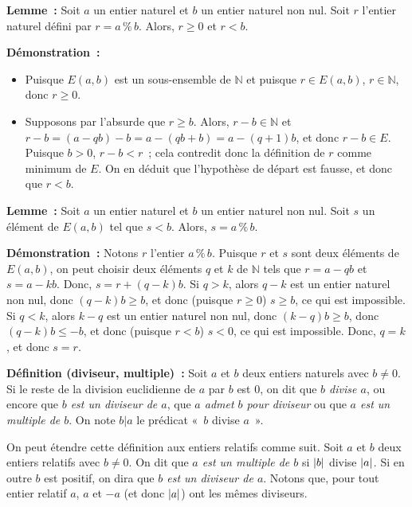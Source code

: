 \noindent\textbf{Lemme :} Soit $a$ un entier naturel et $b$ un entier naturel non nul.
    Soit $r$ l'entier naturel défini par $r = a \mathrel{\%} b$.
    Alors, $r \geq 0$ et $r < b$.

\medskip

\noindent\textbf{Démonstration :} 
\begin{itemize}[nosep]
    \item Puisque $E(a,b)$ est un sous-ensemble de $\mathbb{N}$ et puisque $r \in E(a,b)$, $r \in \mathbb{N}$, donc $r \geq 0$.
    \item Supposons par l'absurde que $r \geq b$. 
        Alors, $r - b \in \mathbb{N}$ et $r - b = (a - q b) - b = a - (q b + b) = a - (q+1) b$, et donc $r - b \in E$. 
        Puisque $b > 0$, $r - b < r$ ; cela contredit donc la définition de $r$ comme minimum de $E$. 
        On en déduit que l'hypothèse de départ est fausse, et donc que $r < b$.
\end{itemize}

\done

\medskip

\noindent\textbf{Lemme :} Soit $a$ un entier naturel et $b$ un entier naturel non nul.
    Soit $s$ un élément de $E(a,b)$ tel que $s < b$.
    Alors, $s = a \mathrel{\%} b$.

\medskip

\noindent\textbf{Démonstration :} 
    Notons $r$ l'entier $a \mathrel{\%} b$.
    Puisque $r$ et $s$ sont deux éléments de $E(a,b)$, on peut choisir deux éléments $q$ et $k$ de $\mathbb{N}$ tels que $r = a - q b$ et $s = a - k b$. 
    Donc, $s = r + (q-k) b$. 
    Si $q > k$, alors $q-k$ est un entier naturel non nul, donc $(q-k) b \geq b$, et donc (puisque $r \geq 0$) $s \geq b$, ce qui est impossible.
    Si $q < k$, alors $k-q$ est un entier naturel non nul, donc $(k-q) b \geq b$, donc $(q-k) b \leq -b$, et donc (puisque $r < b$) $s < 0$, ce qui est impossible. 
    Donc, $q = k$, et donc $s = r$.

    \done

\medskip

\noindent\textbf{Définition (diviseur, multiple) :} 
    Soit $a$ et $b$ deux entiers naturels avec $b \neq 0$.
    Si le reste de la division euclidienne de $a$ par $b$ est $0$, on dit que \textit{$b$ divise $a$}, ou encore que \textit{$b$ est un diviseur de $a$}, que \textit{$a$ admet $b$ pour diviseur} ou que \textit{$a$ est un multiple de $b$}. 
    On note $b \vert a$ le prédicat « $b$ divise $a$ ».

On peut étendre cette définition aux entiers relatifs comme suit. 
Soit $a$ et $b$ deux entiers relatifs avec $b \neq 0$.
On dit que \emph{$a$ est un multiple de $b$} si $\left\lvert b \right\rvert$ divise $\left\lvert a \right\rvert$.
Si en outre $b$ est positif, on dira que \emph{$b$ est un diviseur de $a$}.
Notons que, pour tout entier relatif $a$, $a$ et $-a$ (et donc $\left\lvert a \right\rvert$) ont les mêmes diviseurs.

